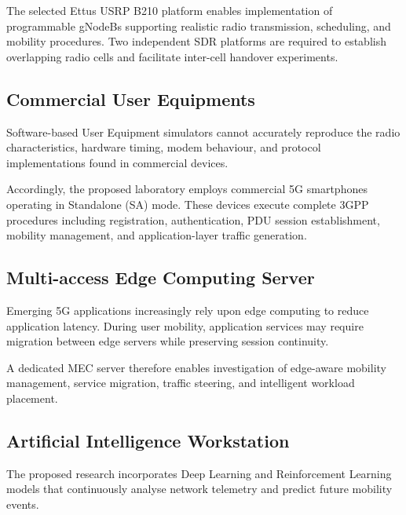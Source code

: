 \documentclass[12pt,a4paper]{article}\usepackage[a4paper,margin=1in]{geometry}\usepackage{graphicx}\usepackage{longtable}\usepackage{booktabs}\usepackage{hyperref}\usepackage{enumitem}\usepackage{amsmath}\usepackage{tikz}\usepackage{pgfgantt}\usepackage{setspace}\setstretch{1.15}\usetikzlibrary{positioning,arrows.meta,shapes.geometric}
\begin{document}
	The selected Ettus USRP B210 platform enables implementation of programmable gNodeBs supporting realistic radio transmission, scheduling, and mobility procedures. Two independent SDR platforms are required to establish overlapping radio cells and facilitate inter-cell handover experiments.
	
	
	\subsection{Commercial User Equipments}
	
	Software-based User Equipment simulators cannot accurately reproduce the radio characteristics, hardware timing, modem behaviour, and protocol implementations found in commercial devices.
	
	Accordingly, the proposed laboratory employs commercial 5G smartphones operating in Standalone (SA) mode. These devices execute complete 3GPP procedures including registration, authentication, PDU session establishment, mobility management, and application-layer traffic generation.
	
	
	\subsection{Multi-access Edge Computing Server}
	
	Emerging 5G applications increasingly rely upon edge computing to reduce application latency. During user mobility, application services may require migration between edge servers while preserving session continuity.
	
	A dedicated MEC server therefore enables investigation of edge-aware mobility management, service migration, traffic steering, and intelligent workload placement.
	
	
	\subsection{Artificial Intelligence Workstation}
	
	The proposed research incorporates Deep Learning and Reinforcement Learning models that continuously analyse network telemetry and predict future mobility events.
	
\end{document}
